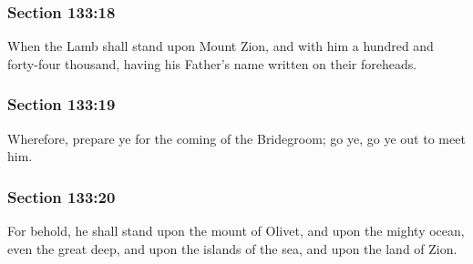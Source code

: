 	\subsubsection{Section 133:18} %
		\label{DC133-18}

		When the Lamb shall stand upon Mount Zion, and with him a hundred and forty-four thousand, having his Father's name written on their foreheads.


	\subsubsection{Section 133:19} %
		\label{DC133-19}

		Wherefore, prepare ye for the coming of the Bridegroom; go ye, go ye out to meet him.


	\subsubsection{Section 133:20} %
		\label{DC133-20}

		For behold, he shall stand upon the mount of Olivet, and upon the mighty ocean, even the great deep, and upon the islands of the sea, and upon the land of Zion.



